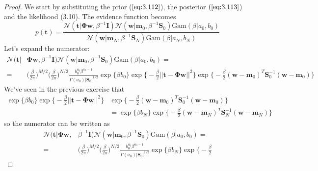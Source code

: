 \vspace{1em}
\begin{proof}
    We start by substituting the prior ($\ref{eq:3.112}$), the
    posterior $(\ref{eq:3.113}$) and the likelihood (3.10). The
    evidence function becomes
    \[
        p(\mathbf{t}) = \frac{
            \mathcal{N}(\mathbf{t} | \mathbf{\Phi}\mathbf{w}, \beta^{-1}\mathbf{I})
            \mathcal{N}(\mathbf{w} | \mathbf{m}_0, \beta^{-1}\mathbf{S}_0)
            \text{Gam}(\beta | a_0, b_0)}{
            \mathcal{N}(\mathbf{w} | \mathbf{m}_N, \beta^{-1}\mathbf{S}_N)
        \text{Gam}(\beta | a_N, b_N)}
    \] 
    Let's expand the numerator:
    \begin{align*}
        \mathcal{N}(\mathbf{t} | &\mathbf{\Phi}\mathbf{w}, \beta^{-1}\mathbf{I})
            \mathcal{N}(\mathbf{w} | \mathbf{m}_0, \beta^{-1}\mathbf{S}_0)
            \text{Gam}(\beta | a_0, b_0) = \\
        =& \bigg(\frac{\beta}{2\pi}\bigg)^{M/2} 
            \bigg(\frac{\beta}{2\pi}\bigg)^{N/2} 
            \frac{b_0^{a_0}\beta^{a_0 - 1}}{\Gamma(a_0)|\mathbf{S}_0|^{1/2}}
            \exp\{\beta b_0\}
            \exp\bigg\{-\frac{\beta}{2} ||\mathbf{t} - \mathbf{\Phi}\mathbf{w}||^2\bigg\}
            \exp\bigg\{-\frac{\beta}{2} (\mathbf{w} - \mathbf{m}_0)^T\mathbf{S}_0^{-1}
                (\mathbf{w} - \mathbf{m}_0)\bigg\}
    \end{align*}
    We've seen in the previous exercise that
    \begin{align*}
        \exp\{\beta b_0\}
         \exp\bigg\{-\frac{\beta}{2} ||\mathbf{t} - \mathbf{\Phi}\mathbf{w}||^2\bigg\}
         &\exp\bigg\{-\frac{\beta}{2}(\mathbf{w} - \mathbf{m}_0)^T
             \mathbf{S}_0^{-1}(\mathbf{w} - \mathbf{m}_0)
         \bigg\} \\
         &= \exp\{\beta b_N\}\exp\bigg\{-\frac{\beta}{2} 
            (\mathbf{w} - \mathbf{m}_N)^T\mathbf{S}_N^{-1}(\mathbf{w} - \mathbf{m}_N)\bigg\}
    \end{align*}
    so the numerator can be written as
    \begin{align*}
        \mathcal{N}(\mathbf{t} | \mathbf{\Phi}\mathbf{w},& \beta^{-1}\mathbf{I})
            \mathcal{N}(\mathbf{w} | \mathbf{m}_0, \beta^{-1}\mathbf{S}_0)
            \text{Gam}(\beta | a_0, b_0) = \\
        =& \bigg(\frac{\beta}{2\pi}\bigg)^{M/2} 
            \bigg(\frac{\beta}{2\pi}\bigg)^{N/2} 
            \frac{b_0^{a_0}\beta^{a_0 - 1}}{\Gamma(a_0)|\mathbf{S}_0|^{1/2}}
            \exp\{\beta b_N\}\exp\bigg\{-\frac{\beta}{2} 

\end{align*}
\end{proof}
